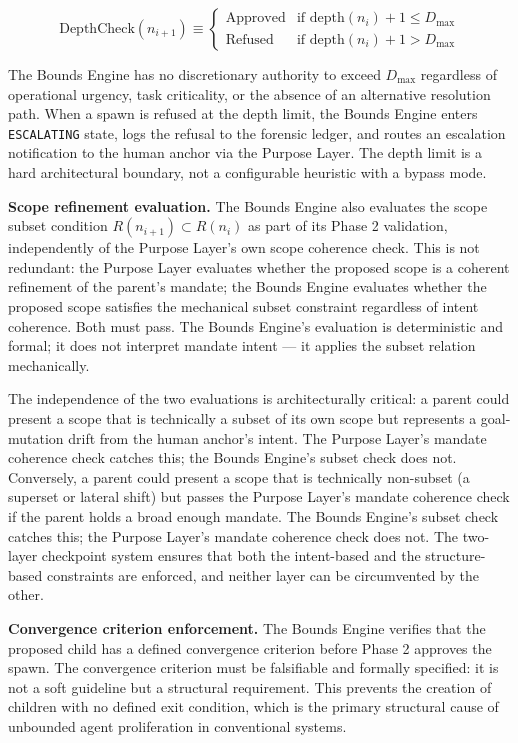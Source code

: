 \begin{equation}
\text{DepthCheck}(n_{i+1}) \equiv
\begin{cases}
\text{Approved} & \text{if } \text{depth}(n_i) + 1 \leq D_{\max} \\
\text{Refused} & \text{if } \text{depth}(n_i) + 1 > D_{\max}
\end{cases}
\label{eq:depth_check}
\end{equation}

The Bounds Engine has no discretionary authority to exceed $D_{\max}$ regardless of operational urgency, task criticality, or the absence of an alternative resolution path. When a spawn is refused at the depth limit, the Bounds Engine enters \texttt{ESCALATING} state, logs the refusal to the forensic ledger, and routes an escalation notification to the human anchor via the Purpose Layer. The depth limit is a hard architectural boundary, not a configurable heuristic with a bypass mode.

\medskip
\noindent\textbf{Scope refinement evaluation.} The Bounds Engine also evaluates the scope subset condition $R(n_{i+1}) \subset R(n_i)$ as part of its Phase 2 validation, independently of the Purpose Layer's own scope coherence check. This is not redundant: the Purpose Layer evaluates whether the proposed scope is a coherent refinement of the parent's mandate; the Bounds Engine evaluates whether the proposed scope satisfies the mechanical subset constraint regardless of intent coherence. Both must pass. The Bounds Engine's evaluation is deterministic and formal; it does not interpret mandate intent --- it applies the subset relation mechanically.

The independence of the two evaluations is architecturally critical: a parent could present a scope that is technically a subset of its own scope but represents a goal-mutation drift from the human anchor's intent. The Purpose Layer's mandate coherence check catches this; the Bounds Engine's subset check does not. Conversely, a parent could present a scope that is technically non-subset (a superset or lateral shift) but passes the Purpose Layer's mandate coherence check if the parent holds a broad enough mandate. The Bounds Engine's subset check catches this; the Purpose Layer's mandate coherence check does not. The two-layer checkpoint system ensures that both the intent-based and the structure-based constraints are enforced, and neither layer can be circumvented by the other.

\medskip
\noindent\textbf{Convergence criterion enforcement.} The Bounds Engine verifies that the proposed child has a defined convergence criterion before Phase 2 approves the spawn. The convergence criterion must be falsifiable and formally specified: it is not a soft guideline but a structural requirement. This prevents the creation of children with no defined exit condition, which is the primary structural cause of unbounded agent proliferation in conventional systems.


